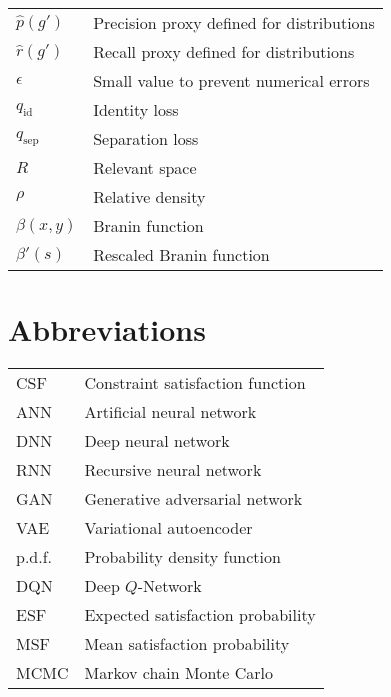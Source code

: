 \documentclass[../main.tex]{subfiles}
\begin{document}
\begin{longtable}[l]{ l l }
    $\hat{p}(g')$ & Precision proxy defined for distributions \\
    $\hat{r}(g')$ & Recall proxy defined for distributions \\
    $\epsilon$ & Small value to prevent numerical errors \\
    $q_\text{id}$ & Identity loss \\
    $q_\text{sep}$ & Separation loss \\
    $R$ & Relevant space \\
    $\rho$ & Relative density \\
    $\beta(x,y)$ & Branin function \\
    $\beta'(s)$ & Rescaled Branin function \\
\end{longtable}

\section*{Abbreviations}

\begin{longtable}[l]{ l l }
    CSF & Constraint satisfaction function \\
    ANN & Artificial neural network \\
    DNN & Deep neural network \\
    RNN & Recursive neural network \\
    GAN & Generative adversarial network \\
    VAE & Variational autoencoder \\
    p.d.f. & Probability density function \\
    DQN & Deep $Q$-Network \\
    ESF & Expected satisfaction probability \\
    MSF & Mean satisfaction probability \\
    MCMC & Markov chain Monte Carlo \\
\end{longtable}
\end{document}
